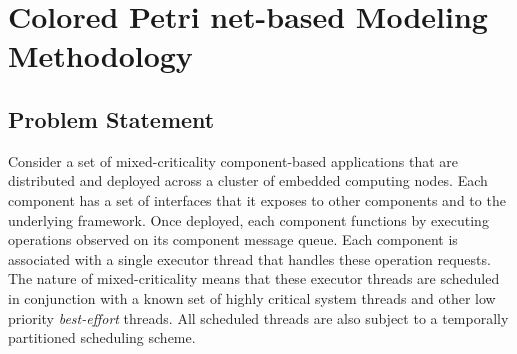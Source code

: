 \chapter{Colored Petri net-based Modeling Methodology}
\label{chapter:modeling}

\section{Problem Statement}

Consider a set of mixed-criticality component-based applications that are distributed and deployed across a cluster of embedded computing nodes. Each component has a set of interfaces that it exposes to other components and to the underlying framework. Once deployed, each component functions by executing operations observed on its component message queue. Each component is associated with a single executor thread that handles these operation requests. The nature of mixed-criticality means that these executor threads are scheduled in conjunction with a known set of highly critical system threads and other low priority \emph{best-effort} threads. All scheduled threads are also subject to a temporally partitioned scheduling scheme. 

